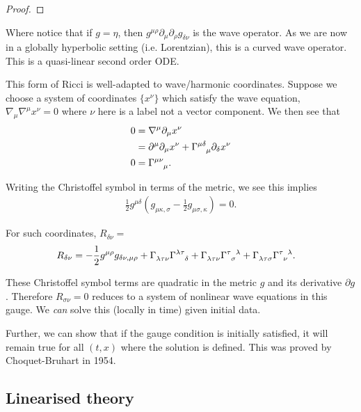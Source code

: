 \begin{proof}
    
\end{proof}

Where notice that if $g = \eta$, then $g^{\mu \rho} \partial_\mu \partial_\rho  g_{\delta \nu}$ is the wave operator. As we are now in a globally hyperbolic setting (i.e. Lorentzian), this is a curved wave operator. This is a quasi-linear second order ODE.

This form of Ricci is well-adapted to wave/harmonic coordinates. Suppose we choose a system of coordinates $\{x^{\nu}\}$ which satisfy the wave equation, $\nabla_\mu \nabla^{\mu} x^{\nu} = 0$ where $\nu$ here is a label not a vector component. We then see that
\begin{align}
    0 &= \nabla^{\mu} \partial_\mu x^{\nu} \\
    &= \partial^{\mu} \partial_\mu x^{\nu} + \tensor{\Gamma}{^{\mu \delta}_\mu} \partial_\delta x^{\nu} \\
    0 &= \tensor{\Gamma}{^{\mu \nu}_{\mu}}
.\end{align}

Writing the Christoffel symbol in terms of the metric, we see this implies
\begin{align} \label{eq:wave_gauge}
    \frac{1}{2} g^{\mu \delta} \left( g_{\mu \kappa ,\sigma} - \frac{1}{2} g_{\mu \sigma , \kappa} \right)  = 0
.\end{align}

For such coordinates, $R_{\delta \nu} = $
\begin{align}
            R_{\delta \nu} &= -\frac{1}{2} g^{\mu \rho} g_{\delta \nu , \mu \rho}  + \tensor{\Gamma}{_{\lambda \tau \nu}} \tensor{\Gamma}{^{\lambda \tau}_{\delta}} + \tensor{\Gamma}{_{\lambda \tau \nu}} \tensor{\Gamma}{^{\tau}_\sigma^{\lambda}} + \tensor{\Gamma}{_{\lambda \tau \sigma}} \tensor{\Gamma}{^{\tau}_{\nu}^{\lambda}} 
.\end{align}

These Christoffel symbol terms are quadratic in the metric $g$ and its derivative $\partial g$. Therefore $R_{\sigma \nu} = 0$ reduces to a system of nonlinear wave equations in this gauge. We \emph{can} solve this (locally in time) given initial data. 

Further, we can show that if the gauge condition is initially satisfied, it will remain true for all $\left( t,x \right) $ where the solution is defined. This was proved by Choquet-Bruhart in 1954.

\subsection{Linearised theory}

